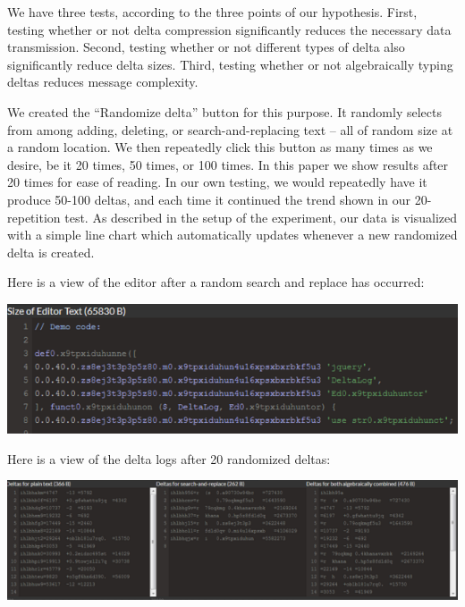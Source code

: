 \documentclass[12pt,a4paper]{article}
\begin{document}
		We have three tests, according to the three points of our hypothesis. First, testing whether or not delta compression significantly reduces the necessary data transmission. Second, testing whether or not different types of delta also significantly reduce delta sizes. Third, testing whether or not algebraically typing deltas reduces message complexity.
		
		We created the “Randomize delta” button for this purpose. It randomly selects from among adding, deleting, or search-and-replacing text -- all of random size at a random location. We then repeatedly click this button as many times as we desire, be it 20 times, 50 times, or 100 times. In this paper we show results after 20 times for ease of reading. In our own testing, we would repeatedly have it produce 50-100 deltas, and each time it continued the trend shown in our 20-repetition test. As described in the setup of the experiment, our data is visualized with a simple line chart which automatically updates whenever a new randomized delta is created.
		
		Here is a view of the editor after a random search and replace has occurred:

		\begin{center}\includegraphics{resultsEditor}\end{center}
		
		Here is a view of the delta logs after 20 randomized deltas:
		
		\begin{center}\includegraphics[]{resultsDeltaLogs}\end{center}
		
\end{document}
